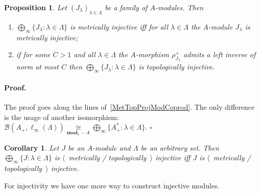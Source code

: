 \documentclass[12pt]{article}
\newcommand{\isom}[1]{\mathop{\mathbin{\cong}}\limits_{#1}}
\newtheorem{proposition}[theorem]{Proposition}
\newtheorem{corollary}[theorem]{Corollary}
\renewenvironment{proof}{\paragraph{Proof.}}{\hfill$\square$\medskip}
\begin{document}
\begin{proposition}\label{MetTopInjModProd} Let
    ${(J_\lambda)}_{\lambda\in\Lambda}$ be a family of $A$-modules. Then
    \begin{enumerate}[label = (\roman*)]
        \item $\bigoplus_\infty \{J_\lambda:\lambda\in\Lambda \}$ is metrically
              injective iff for all $\lambda\in\Lambda$ the $A$-module
              $J_\lambda$ is metrically injective;

        \item if for some $C>1$ and all $\lambda\in\Lambda$ the $A$-morphism
              $\rho_{J_\lambda}^+$ admits a left inverse of norm at most $C$
              then $\bigoplus_\infty \{J_\lambda:\lambda\in\Lambda \}$ is
              topologically injective.
    \end{enumerate}
\end{proposition}
\begin{proof} The proof goes along the lines of~\ref{MetTopProjModCoprod}. The
    only difference is the usage of another isomorphism:
    $\mathcal{B}(A_+,\ell_\infty(\Lambda)) \isom{\mathbf{mod}_1-A}\bigoplus_\infty
        \{A_+^*:\lambda\in\Lambda \}$.
\end{proof}

\begin{corollary}\label{MetTopInjlInftySum} Let $J$ be an $A$-module and
    $\Lambda$ be an arbitrary set. Then
    $\bigoplus_\infty \{J:\lambda\in\Lambda \}$ is
    $\langle$~metrically / topologically~$\rangle$ injective iff $J$ is
    $\langle$~metrically / topologically~$\rangle$ injective.
\end{corollary}

For injectivity we have one more way to construct injective modules.
\end{document}
